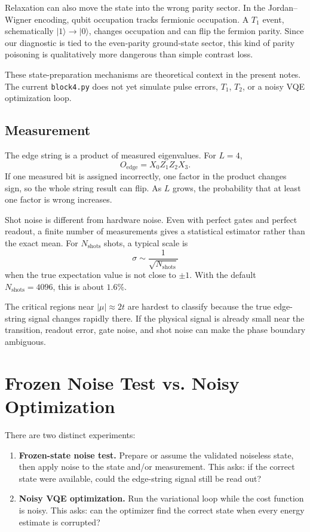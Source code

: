 \documentclass[11pt]{article}
\newcommand{\ket}[1]{|#1\rangle}
\begin{document}
Relaxation can also move the state into the wrong parity sector. In the Jordan--Wigner encoding, qubit occupation tracks fermionic occupation. A $T_1$ event, schematically $\ket{1}\to\ket{0}$, changes occupation and can flip the fermion parity. Since our diagnostic is tied to the even-parity ground-state sector, this kind of parity poisoning is qualitatively more dangerous than simple contrast loss.

These state-preparation mechanisms are theoretical context in the present notes. The current \texttt{block4.py} does not yet simulate pulse errors, $T_1$, $T_2$, or a noisy VQE optimization loop.

\subsection{Measurement}

The edge string is a product of measured eigenvalues. For $L=4$,
\[
  O_{\mathrm{edge}}=X_0Z_1Z_2X_3.
\]
If one measured bit is assigned incorrectly, one factor in the product changes sign, so the whole string result can flip. As $L$ grows, the probability that at least one factor is wrong increases.

Shot noise is different from hardware noise. Even with perfect gates and perfect readout, a finite number of measurements gives a statistical estimator rather than the exact mean. For $N_{\mathrm{shots}}$ shots, a typical scale is
\[
  \sigma \sim \frac{1}{\sqrt{N_{\mathrm{shots}}}}
\]
when the true expectation value is not close to $\pm1$. With the default $N_{\mathrm{shots}}=4096$, this is about $1.6\%$.

The critical regions near $|\mu|\approx2t$ are hardest to classify because the true edge-string signal changes rapidly there. If the physical signal is already small near the transition, readout error, gate noise, and shot noise can make the phase boundary ambiguous.

\section{Frozen Noise Test vs. Noisy Optimization}

There are two distinct experiments:
\begin{enumerate}
  \item \textbf{Frozen-state noise test.} Prepare or assume the validated noiseless state, then apply noise to the state and/or measurement. This asks: if the correct state were available, could the edge-string signal still be read out?
  \item \textbf{Noisy VQE optimization.} Run the variational loop while the cost function is noisy. This asks: can the optimizer find the correct state when every energy estimate is corrupted?
\end{enumerate}
\end{document}
